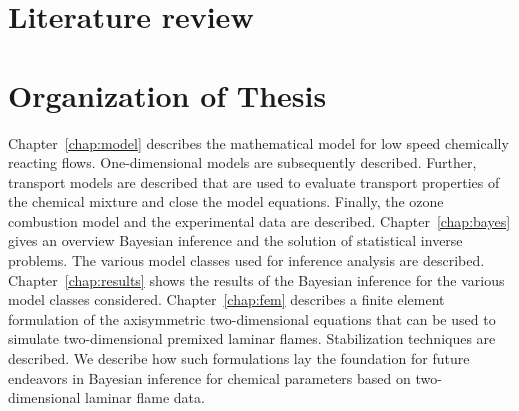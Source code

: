 \section{Literature review}



\section{Organization of Thesis}
\bigskip

Chapter~\ref{chap:model} describes the mathematical model for low speed
chemically reacting flows. One-dimensional models are subsequently described.
Further, transport models are described that are used to evaluate
transport properties of the chemical mixture and close the model equations.
Finally, the ozone combustion model and the experimental data are
described.
Chapter~\ref{chap:bayes} gives an overview
Bayesian inference and the solution of statistical inverse problems.
The various model classes used for inference
analysis are described.
Chapter~\ref{chap:results} shows the results of the Bayesian inference
for the various model classes considered.
Chapter~\ref{chap:fem} describes a finite element formulation of the
axisymmetric two-dimensional equations that can be used to simulate
two-dimensional premixed laminar flames. Stabilization techniques are
described. We describe how such formulations lay the foundation for future
endeavors in Bayesian inference for chemical parameters based on
two-dimensional laminar flame data.
